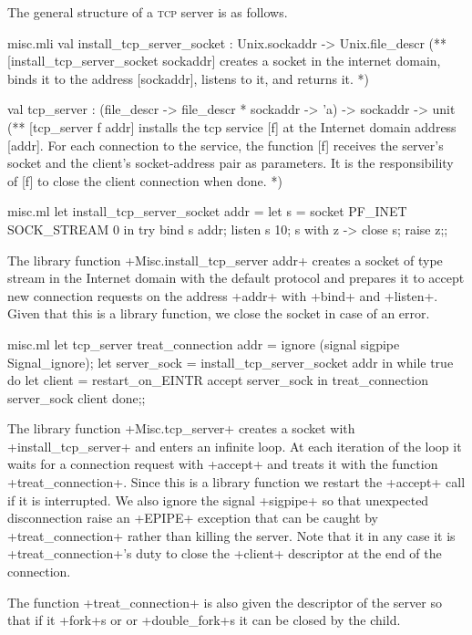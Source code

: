 The general structure of a \textsc{tcp} server is as follows.
%
\begin{codefile}{misc.mli}
val install_tcp_server_socket : Unix.sockaddr -> Unix.file_descr
(** [install_tcp_server_socket sockaddr] creates a socket in the internet
 domain,  binds it to the address [sockaddr], listens to it, and returns
it. *)

val tcp_server :
 (file_descr -> file_descr * sockaddr -> 'a) -> sockaddr -> unit
(** [tcp_server f addr] installs the tcp service [f] at the Internet domain
   address  [addr]. For each connection to the service, the
   function [f] receives the server's socket and the client's
   socket-address pair as parameters. It is the responsibility of  [f] to
   close the client connection when done. *)
\end{codefile}
%
\begin{listingcodefile}{misc.ml}
let install_tcp_server_socket addr =
  let s = socket PF_INET SOCK_STREAM 0 in
  try
    bind s addr;
    listen s 10;
    s
  with z -> close s; raise z;;
\end{listingcodefile}
The library function \ml+Misc.install_tcp_server addr+ creates a
socket of type stream in the Internet domain with the default protocol 
and prepares it to accept new connection requests on the address \ml+addr+
with \ml+bind+ and \ml+listen+. Given that this is a library
function, we close the socket in case of an error.

\begin{listingcodefile}{misc.ml}
let tcp_server treat_connection addr =
  ignore (signal sigpipe Signal_ignore);
  let server_sock = install_tcp_server_socket addr in
  while true do
      let client = restart_on_EINTR accept server_sock in
      treat_connection server_sock client
  done;;
\end{listingcodefile}
The library function \ml+Misc.tcp_server+ creates a socket with
\ml+install_tcp_server+ and enters an infinite loop. At each iteration
of the loop it waits for a connection request with \ml+accept+ and
treats it with the function \ml+treat_connection+. Since this is a
library function we restart the \ml+accept+ call if it is
interrupted. We also ignore the signal \ml+sigpipe+ so that unexpected
disconnection raise an \ml+EPIPE+ exception that can be caught by
\ml+treat_connection+ rather than killing the server. Note that it in
any case it is \ml+treat_connection+'s duty to close the \ml+client+
descriptor at the end of the connection.

The function \ml+treat_connection+ is also given the descriptor of the
server so that if it \ml+fork+s or or \ml+double_fork+s it can be
closed by the child.

